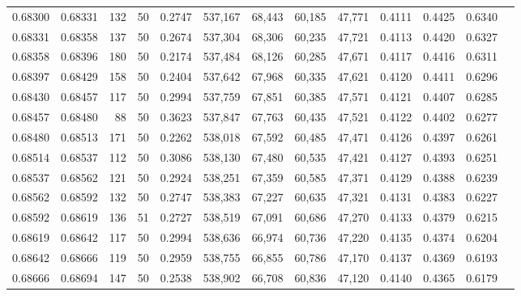 \begin{tabular}{rrrrrrrrrrrrr}
0.68300 & 0.68331 &   132 &  50 &                                     0.2747 & 537,167 &  68,443 &  60,185 &  47,771 & 0.4111 & 0.4425 & 0.6340 \\
0.68331 & 0.68358 &   137 &  50 &                                     0.2674 & 537,304 &  68,306 &  60,235 &  47,721 & 0.4113 & 0.4420 & 0.6327 \\
0.68358 & 0.68396 &   180 &  50 &                                     0.2174 & 537,484 &  68,126 &  60,285 &  47,671 & 0.4117 & 0.4416 & 0.6311 \\
0.68397 & 0.68429 &   158 &  50 &                                     0.2404 & 537,642 &  67,968 &  60,335 &  47,621 & 0.4120 & 0.4411 & 0.6296 \\
0.68430 & 0.68457 &   117 &  50 &                                     0.2994 & 537,759 &  67,851 &  60,385 &  47,571 & 0.4121 & 0.4407 & 0.6285 \\
0.68457 & 0.68480 &    88 &  50 &                                     0.3623 & 537,847 &  67,763 &  60,435 &  47,521 & 0.4122 & 0.4402 & 0.6277 \\
0.68480 & 0.68513 &   171 &  50 &                                     0.2262 & 538,018 &  67,592 &  60,485 &  47,471 & 0.4126 & 0.4397 & 0.6261 \\
0.68514 & 0.68537 &   112 &  50 &                                     0.3086 & 538,130 &  67,480 &  60,535 &  47,421 & 0.4127 & 0.4393 & 0.6251 \\
0.68537 & 0.68562 &   121 &  50 &                                     0.2924 & 538,251 &  67,359 &  60,585 &  47,371 & 0.4129 & 0.4388 & 0.6239 \\
0.68562 & 0.68592 &   132 &  50 &                                     0.2747 & 538,383 &  67,227 &  60,635 &  47,321 & 0.4131 & 0.4383 & 0.6227 \\
0.68592 & 0.68619 &   136 &  51 &                                     0.2727 & 538,519 &  67,091 &  60,686 &  47,270 & 0.4133 & 0.4379 & 0.6215 \\
0.68619 & 0.68642 &   117 &  50 &                                     0.2994 & 538,636 &  66,974 &  60,736 &  47,220 & 0.4135 & 0.4374 & 0.6204 \\
0.68642 & 0.68666 &   119 &  50 &                                     0.2959 & 538,755 &  66,855 &  60,786 &  47,170 & 0.4137 & 0.4369 & 0.6193 \\
0.68666 & 0.68694 &   147 &  50 &                                     0.2538 & 538,902 &  66,708 &  60,836 &  47,120 & 0.4140 & 0.4365 & 0.6179 \\

\end{tabular}
